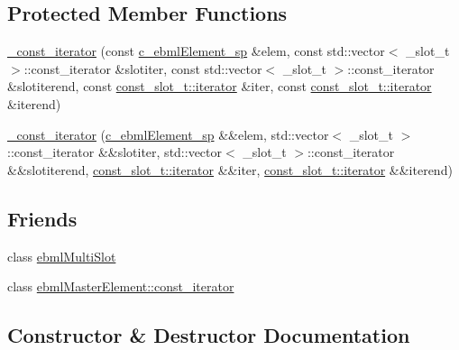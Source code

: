 \subsection*{Protected Member Functions}
\begin{DoxyCompactItemize}
\item 
\mbox{\hyperlink{classebml_1_1ebmlMultiSlot_1_1__const__iterator_a5b4e23f10ca68b3ada0101d6a085f48d}{\+\_\+const\+\_\+iterator}} (const \mbox{\hyperlink{namespaceebml_a2deef4e8071531b32e3533f1bf978917}{c\+\_\+ebml\+Element\+\_\+sp}} \&elem, const std\+::vector$<$ \+\_\+slot\+\_\+t $>$\+::const\+\_\+iterator \&slotiter, const std\+::vector$<$ \+\_\+slot\+\_\+t $>$\+::const\+\_\+iterator \&slotiterend, const \mbox{\hyperlink{classebml_1_1const__slot__t_1_1iterator}{const\+\_\+slot\+\_\+t\+::iterator}} \&iter, const \mbox{\hyperlink{classebml_1_1const__slot__t_1_1iterator}{const\+\_\+slot\+\_\+t\+::iterator}} \&iterend)
\item 
\mbox{\hyperlink{classebml_1_1ebmlMultiSlot_1_1__const__iterator_a681e9596c1ae982f3c482548cb16333d}{\+\_\+const\+\_\+iterator}} (\mbox{\hyperlink{namespaceebml_a2deef4e8071531b32e3533f1bf978917}{c\+\_\+ebml\+Element\+\_\+sp}} \&\&elem, std\+::vector$<$ \+\_\+slot\+\_\+t $>$\+::const\+\_\+iterator \&\&slotiter, std\+::vector$<$ \+\_\+slot\+\_\+t $>$\+::const\+\_\+iterator \&\&slotiterend, \mbox{\hyperlink{classebml_1_1const__slot__t_1_1iterator}{const\+\_\+slot\+\_\+t\+::iterator}} \&\&iter, \mbox{\hyperlink{classebml_1_1const__slot__t_1_1iterator}{const\+\_\+slot\+\_\+t\+::iterator}} \&\&iterend)
\end{DoxyCompactItemize}
\subsection*{Friends}
\begin{DoxyCompactItemize}
\item 
class \mbox{\hyperlink{classebml_1_1ebmlMultiSlot_1_1__const__iterator_ab14eb6c5a125d7276a7b4b5b6573428b}{ebml\+Multi\+Slot}}
\item 
class \mbox{\hyperlink{classebml_1_1ebmlMultiSlot_1_1__const__iterator_a734affd0f736e2e4e03ab2cf8a9f9b26}{ebml\+Master\+Element\+::const\+\_\+iterator}}
\end{DoxyCompactItemize}


\subsection{Constructor \& Destructor Documentation}
\mbox{\label{classebml_1_1ebmlMultiSlot_1_1__const__iterator_a5b4e23f10ca68b3ada0101d6a085f48d}} 
